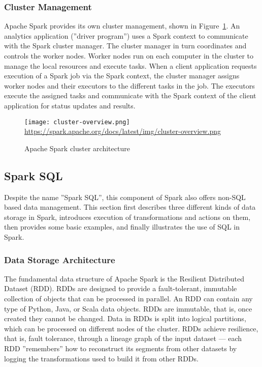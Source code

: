 \subsubsection*{Cluster Management}

Apache Spark provides its own cluster management, shown in Figure~\ref{fig:sparkcluster}. An analytics application (''driver program'') uses a Spark context to communicate with the Spark cluster manager. The cluster manager in turn coordinates and controls the worker nodes. Worker nodes run on each computer in the cluster to manage the local resources and execute tasks. When a client application requests execution of a Spark job via the Spark context, the cluster manager assigns worker nodes and their executors to the different tasks in the job. The executors execute the assigned tasks and communicate with the Spark context of the client application for status updates and results.

\begin{figure}
\centering

\texttt{[image: cluster-overview.png]}
\scriptsize \url{https://spark.apache.org/docs/latest/img/cluster-overview.png}
\caption{Apache Spark cluster architecture}
\label{fig:sparkcluster}
\end{figure}

\subsection{Spark SQL}

Despite the name ''Spark SQL'', this component of Spark also offers non-SQL based data management. This section first describes three different kinds of data storage in Spark, introduces execution of transformations and actions on them, then provides some basic examples, and finally illustrates the use of SQL in Spark.

\subsubsection*{Data Storage Architecture}

The fundamental data structure of Apache Spark is the Resilient Distributed Dataset (RDD). RDDs are designed to provide a fault-tolerant, immutable collection of objects that can be processed in parallel. An RDD can contain any type of Python, Java, or Scala data objects. RDDs are immutable, that is, once created they cannot be changed. Data in RDDs is split into logical partitions, which can be processed on different nodes of the cluster. RDDs achieve resilience, that is, fault tolerance, through a lineage graph of the input dataset --- each RDD ''remembers'' how to reconstruct its segments from other datasets by logging the transformations used to build it from other RDDs.

